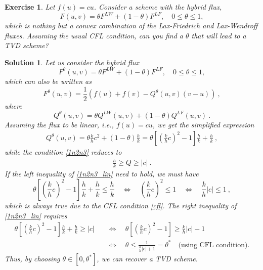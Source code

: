 \documentclass[10pt,letterpaper]{article}
\theoremstyle{break}
\newtheorem{exercise}{Exercise}
\newtheorem{solution}{Solution}
\begin{document}
\begin{exercise}
        Let $f(u) = c u$. Consider a scheme with the hybrid flux,
        \[
        F(u,v) = \theta F^{LW} + (1-\theta) F^{LF}, \quad 0 \leq \theta \leq 1,
        \]
        which is nothing but a convex combination of the Lax-Friedrich and Lax-Wendroff fluxes.
        Assuming the usual CFL condition, can you find a $\theta$ that will lead to a TVD scheme?
\end{exercise}


\begin{solution}
        Let us consider the hybrid flux 
        \[
        F^\theta(u,v) = \theta F^{LW} + (1-\theta) F^{LF}, \quad 0 \leq \theta \leq 1,
        \]
        which can also be written as
        \[
        F^\theta(u,v) = \frac{1}{2} \left( f(u) + f(v) - Q^\theta(u,v) (v-u)\right) \ , 
        \]
        where
        \[
        Q^\theta(u,v) = \theta Q^{LW}(u,v) + (1-\theta) Q^{LF}(u,v)\ .
        \]
        Assuming the flux to be linear, i.e., $f(u) = cu$, we get the simplified expression
        \begin{gather} \label{hybQ}
        Q^\theta(u,v) = \theta \frac{k}{h} c^2 + (1-\theta) \frac{h}{k} = \theta\left[ \left(\frac{k}{h} c\right)^2 - 1\right]\frac{h}{k} + \frac{h}{k}\ ,
        \end{gather}
        while the condition \eqref{1n2n3} reduces to 
        \begin{gather} \label{1n2n3_lin}
        \frac{h}{k} \geq Q \geq |c|\ .
        \end{gather}
        If the left inequality of \eqref{1n2n3_lin} need to hold, we must have
        \[
        \theta\left[ \left(\frac{k}{h} c\right)^2 - 1\right]\frac{h}{k} + \frac{h}{k} \leq \frac{h}{k} \quad \iff \quad \left(\frac{k}{h} c\right)^2 \leq 1 \quad \iff \quad \frac{k}{h} |c| \leq 1\ ,
        \]
        which is always true due to the CFL condition \eqref{cfl}. The right inequality of \eqref{1n2n3_lin} requires
        \begin{align*}
        \theta\left[ \left(\frac{k}{h} c\right)^2 - 1\right]\frac{h}{k} + \frac{h}{k} \geq |c| &\quad \iff \quad \theta\left[ \left(\frac{k}{h} c\right)^2 - 1\right]\geq \frac{k}{h} |c| -1 \\
        &\quad \iff \quad \theta \leq \frac{1}{\frac{k}{h} |c| + 1} = \theta^* \quad \text{(using CFL condition)}.
        \end{align*}
        Thus, by choosing $\theta \in [0,\theta^*]$, we can recover a TVD scheme.        
\end{solution}




\newpage
\end{document}
